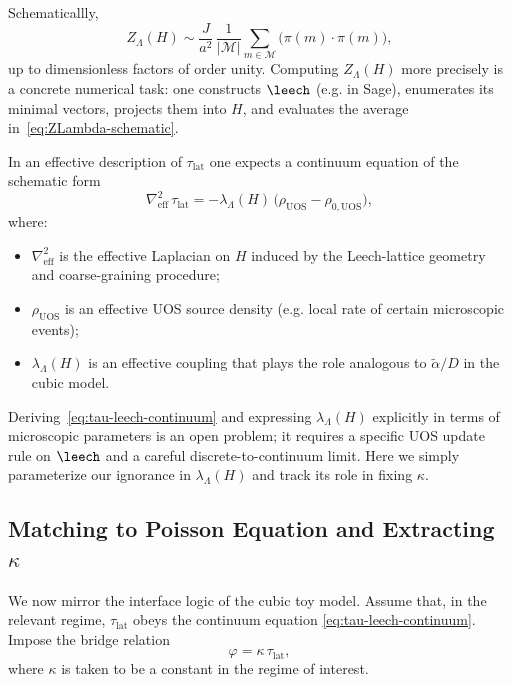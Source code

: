Schematicallly,
\begin{equation}
  Z_{\Lambda}(H) \sim
  \frac{J}{a^2}\,\frac{1}{|\mathcal{M}|} \sum_{m \in \mathcal{M}}
  \big(\pi(m) \cdot \pi(m)\big),
  \label{eq:ZLambda-schematic}
\end{equation}
up to dimensionless factors of order unity. Computing $Z_{\Lambda}(H)$ more
precisely is a concrete numerical task: one constructs $\leech$ (e.g. in Sage),
enumerates its minimal vectors, projects them into $H$, and evaluates the
average in~\eqref{eq:ZLambda-schematic}.

In an effective description of $\tau_{\mathrm{lat}}$ one expects a continuum
equation of the schematic form
\begin{equation}
  \nabla^2_{\text{eff}}\, \tau_{\mathrm{lat}} =
  -\lambda_{\Lambda}(H)\,\big(\rho_{\mathrm{UOS}} -
  \rho_{0,\mathrm{UOS}}\big),
  \label{eq:tau-leech-continuum}
\end{equation}
where:
\begin{itemize}
  \item $\nabla^2_{\text{eff}}$ is the effective Laplacian on $H$ induced by
        the Leech-lattice geometry and coarse-graining procedure;
  \item $\rho_{\mathrm{UOS}}$ is an effective UOS source density (e.g. local
        rate of certain microscopic events);
  \item $\lambda_{\Lambda}(H)$ is an effective coupling that plays the role
        analogous to $\tilde{\alpha}/D$ in the cubic model.
\end{itemize}

Deriving~\eqref{eq:tau-leech-continuum} and expressing $\lambda_{\Lambda}(H)$
explicitly in terms of microscopic parameters is an open problem; it requires
a specific UOS update rule on $\leech$ and a careful discrete-to-continuum
limit. Here we simply parameterize our ignorance in $\lambda_{\Lambda}(H)$ and
track its role in fixing $\kappa$.

\subsection{Matching to Poisson Equation and Extracting $\kappa$}
\label{subsec:kappa-leech-matching}

We now mirror the interface logic of the cubic toy model. Assume that, in the
relevant regime, $\tau_{\mathrm{lat}}$ obeys the continuum equation
\eqref{eq:tau-leech-continuum}. Impose the bridge relation
\begin{equation}
  \varphi = \kappa\,\tau_{\mathrm{lat}},
\end{equation}
where $\kappa$ is taken to be a constant in the regime of interest.

